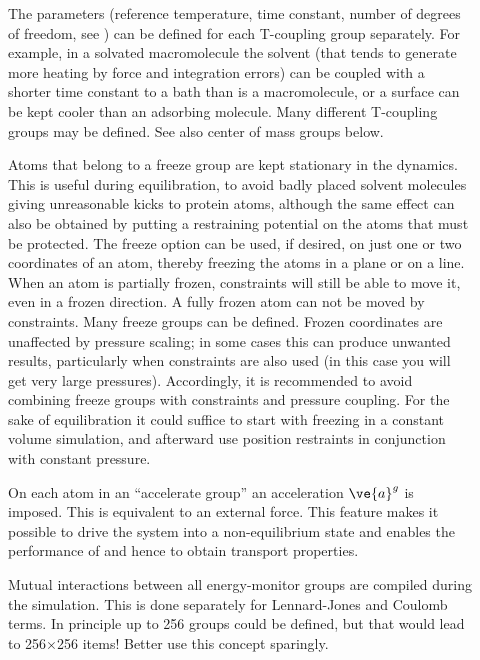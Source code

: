 \begin{description}
\item[]
The  parameters (reference
temperature, time constant, number of degrees of freedom, see
) can be defined for each T-coupling group
separately. For example, in a solvated macromolecule the solvent (that
tends to generate more heating by force and integration errors) can be
coupled with a shorter time constant to a bath than is a macromolecule,
or a surface can be kept cooler than an adsorbing molecule. Many
different T-coupling groups may be defined. See also center of mass
groups below.

\item[]
Atoms that belong to a freeze group are kept stationary in the
dynamics. This is useful during equilibration, {\eg} to avoid badly
placed solvent molecules giving unreasonable kicks to protein atoms,
although the same effect can also be obtained by putting a restraining
potential on the atoms that must be protected. The freeze option can
be used, if desired, on just one or two coordinates of an atom,
thereby freezing the atoms in a plane or on a line.  When an atom is
partially frozen, constraints will still be able to move it, even in a
frozen direction. A fully frozen atom can not be moved by constraints.
Many freeze groups can be defined.  Frozen coordinates are unaffected
by pressure scaling; in some cases this can produce unwanted results,
particularly when constraints are also used (in this case you will
get very large pressures). Accordingly, it is recommended to avoid
combining freeze groups with constraints and pressure coupling. For the
sake of equilibration it could suffice to start with freezing in a
constant volume simulation, and afterward use position restraints in
conjunction with constant pressure.

\item[]
On each atom in an ``accelerate group'' an acceleration
$\ve{a}^g$ is imposed. This is equivalent to an external
force. This feature makes it possible to drive the system into a
non-equilibrium state and enables the performance of 
 and hence to obtain transport properties.

\item[]
Mutual interactions between all energy-monitor groups are compiled
during the simulation. This is done separately for Lennard-Jones and
Coulomb terms.  In principle up to 256 groups could be defined, but
that would lead to 256$\times$256 items! Better use this concept
sparingly.


\end{description}
